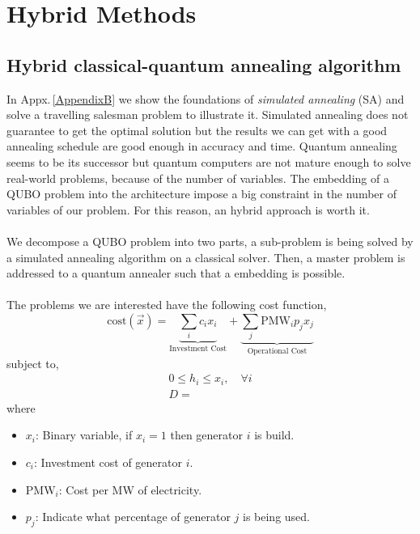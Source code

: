 
\chapter{Hybrid Methods} %

\label{Chapter3} %
\section{Hybrid classical-quantum annealing algorithm}
In Appx.\,\ref{AppendixB} we show the foundations of \textit{simulated annealing} (SA) and solve a travelling salesman problem to illustrate it. Simulated annealing does not guarantee to get the optimal solution but the results we can get with a good annealing schedule are good enough in accuracy and time. Quantum annealing seems to be its successor but quantum computers are not mature enough to solve real-world problems, because of the number of variables. The embedding of a QUBO problem into the architecture impose a big constraint in the number of variables of our problem. For this reason, an hybrid approach is worth it.\\\\
We decompose a QUBO problem into two parts, a sub-problem is being solved by a simulated annealing algorithm on a classical solver. Then, a master problem is addressed to a quantum annealer such that a embedding is possible.\\\\
The problems we are interested have the following cost function,
\begin{equation}
    \text{cost}(\vec{x}) = \underbrace{\sum_{i}c_{i}x_{i}}_{\text{Investment Cost}} + \underbrace{\sum_{j}\text{PMW}_{i}p_{j}x_{j}}_{\text{Operational Cost}}
\end{equation}
subject to,
\begin{align}
    0 \leq h_{i} \leq x_{i}, \quad \forall i \\
    D = 
\end{align}
where
\begin{itemize}
    \item $x_{i}$: Binary variable, if $x_{i}=1$ then generator $i$ is build.
    \item $c_{i}$: Investment cost of generator $i$.
    \item $\text{PMW}_{i}$: Cost per MW of electricity.
    \item $p_{j}$: Indicate what percentage of generator $j$ is being used.
\end{itemize}
